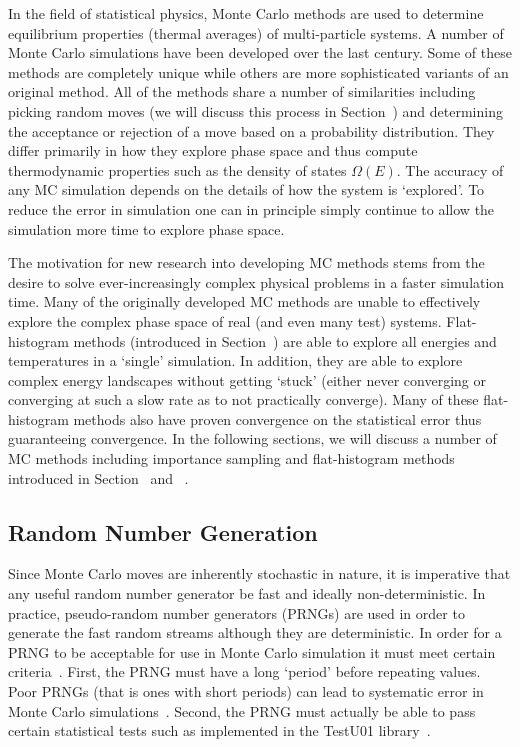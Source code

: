 In the field of statistical physics, Monte Carlo methods are used to determine
equilibrium properties (thermal averages) of multi-particle systems. A number
of Monte Carlo simulations have been developed over the last century. Some of
these methods are completely unique while others are more sophisticated
variants of an original method. All of the methods share a number of
similarities including picking random moves (we will discuss this process in
Section~) and determining the acceptance or rejection of a move based
on a probability distribution. They differ primarily in how they explore phase
space and thus compute thermodynamic properties such as the density of states
$\Omega(E)$. The accuracy of any MC simulation depends on the details of how
the system is `explored'. To reduce the error in simulation one can in
principle simply continue to allow the simulation more time to explore phase
space.

The motivation for new research into developing MC methods stems from the
desire to solve ever-increasingly complex physical problems in a faster
simulation time. Many of the originally developed MC methods are unable to
effectively explore the complex phase space of real (and even many test)
systems. Flat-histogram methods (introduced in Section~) are able to
explore all energies and temperatures in a `single' simulation. In addition,
they are able to explore complex energy landscapes without getting `stuck'
(either never converging or converging at such a slow rate as to not
practically converge). Many of these flat-histogram methods also have proven
convergence on the statistical error thus guaranteeing convergence. In the
following sections, we will discuss a number of MC methods including importance
sampling and flat-histogram methods introduced in Section~ and
~.

\subsection{Random Number Generation}\label{rng}

Since Monte Carlo moves are inherently stochastic in nature, it is imperative
that any useful random number generator be fast and ideally non-deterministic.
In practice, pseudo-random number generators (PRNGs) are used in order to
generate the fast random streams although they are deterministic. In order for
a PRNG to be acceptable for use in Monte Carlo simulation it must meet certain
criteria~\cite{sawilowsky2003you}. First, the PRNG must have a long `period'
before repeating values. Poor PRNGs (that is ones with short periods) can lead
to systematic error in Monte Carlo simulations~\cite{ferrenberg1992monte,
plascak2002cluster, ossola2004systematic}. Second, the PRNG must actually be
able to pass certain statistical tests such as implemented in the TestU01
library~\cite{l2007testu01}.


